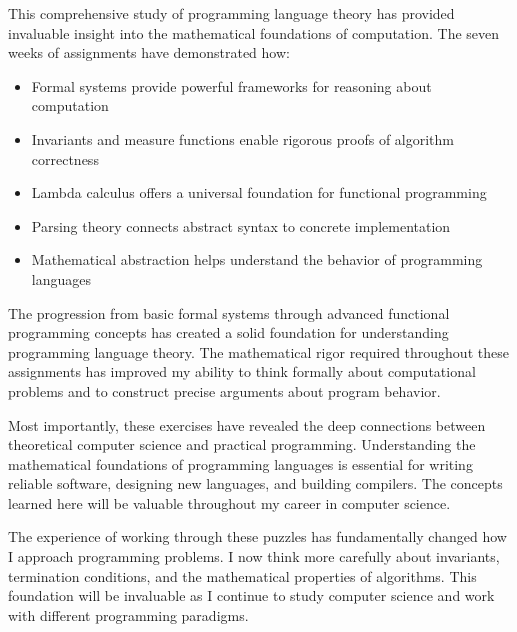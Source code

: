 \documentclass{article}
\theoremstyle{plain}
\theoremstyle{definition}
\theoremstyle{remark}
\begin{document}
This comprehensive study of programming language theory has provided invaluable insight into the mathematical foundations of computation. The seven weeks of assignments have demonstrated how:

\begin{itemize}
\item Formal systems provide powerful frameworks for reasoning about computation
\item Invariants and measure functions enable rigorous proofs of algorithm correctness
\item Lambda calculus offers a universal foundation for functional programming
\item Parsing theory connects abstract syntax to concrete implementation
\item Mathematical abstraction helps understand the behavior of programming languages
\end{itemize}

The progression from basic formal systems through advanced functional programming concepts has created a solid foundation for understanding programming language theory. The mathematical rigor required throughout these assignments has improved my ability to think formally about computational problems and to construct precise arguments about program behavior.

Most importantly, these exercises have revealed the deep connections between theoretical computer science and practical programming. Understanding the mathematical foundations of programming languages is essential for writing reliable software, designing new languages, and building compilers. The concepts learned here will be valuable throughout my career in computer science.

The experience of working through these puzzles has fundamentally changed how I approach programming problems. I now think more carefully about invariants, termination conditions, and the mathematical properties of algorithms. This foundation will be invaluable as I continue to study computer science and work with different programming paradigms.
\end{document}
